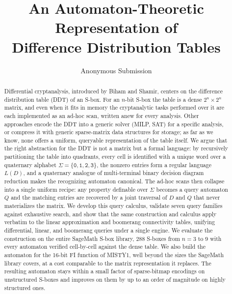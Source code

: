 \documentclass[runningheads]{llncs}
\begin{document}
\title{An Automaton-Theoretic Representation of\\ Difference Distribution Tables}
\author{Anonymous Submission}
\institute{}
\maketitle

\begin{abstract}
Differential cryptanalysis, introduced by Biham and Shamir, centers on the
difference distribution table (DDT) of an S-box. For an $n$-bit S-box the table
is a dense $2^{n}\times 2^{n}$ matrix, and even when it fits in memory the
cryptanalytic tasks performed over it are each implemented as an ad-hoc scan,
written anew for every analysis. Other approaches encode the DDT into a generic
solver (MILP, SAT) for a specific analysis, or compress it with generic
sparse-matrix data structures for storage; as far as we know, none offers a uniform, queryable
representation of the table itself. We argue that the right abstraction for the DDT is not a matrix but
a formal language: by recursively partitioning the table
into quadrants, every cell is identified with a unique word over a quaternary
alphabet $\Sigma = \{\texttt{0},\texttt{1},\texttt{2},\texttt{3}\}$, the nonzero entries form a
regular language $L(D)$, and a quaternary analogue of multi-terminal binary
decision diagram reduction makes the recognizing automaton canonical. The ad-hoc scans then collapse into a single uniform recipe: any property
definable over $\Sigma$ becomes a query automaton $Q$ and the matching entries are recovered by a joint traversal of $D$ and $Q$ that
never materializes the matrix. We develop this query calculus, validate seven
query families against exhaustive search, and show that the same construction
and calculus apply verbatim to the linear approximation and boomerang
connectivity tables, unifying differential, linear, and boomerang queries under
a single engine. We evaluate the construction on the entire
SageMath S-box library, $288$ S-boxes from $n=3$ to $9$ with every automaton
verified cell-by-cell against the dense table. We also build the automaton for the 16-bit FI function of MISTY1, well beyond the sizes the SageMath library covers, at a cost comparable to the matrix representation it replaces. The resulting automaton stays within a small factor of
sparse-bitmap encodings on unstructured S-boxes and improves on them by up to
an order of magnitude on highly structured ones.
\end{abstract}
\end{document}
